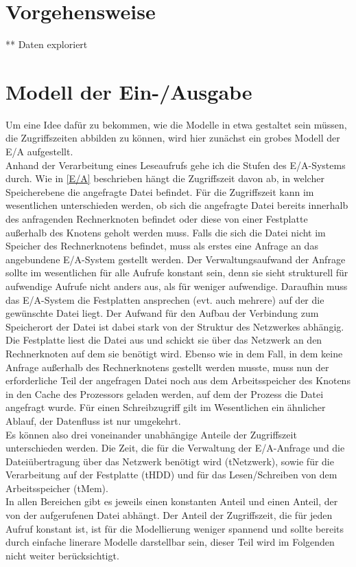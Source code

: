 \documentclass[
	12pt,
	a4paper,
	BCOR10mm,
	DIV14,
	listof=totoc,
	bibliography=totoc,
	headsepline
]{scrreprt}
\begin{document}
\section{Vorgehensweise}
** Daten exploriert\\


\section{Modell der Ein-/Ausgabe}
Um eine Idee dafür zu bekommen, wie die Modelle in etwa gestaltet sein müssen, die Zugriffszeiten abbilden zu können, wird hier zunächst ein grobes Modell der E/A aufgestellt.\\
Anhand der Verarbeitung eines Leseaufrufs gehe ich die Stufen des E/A-Systems durch. Wie in \ref{E/A} beschrieben hängt die Zugriffszeit davon ab, in welcher Speicherebene die angefragte Datei befindet. Für die Zugriffszeit kann im wesentlichen unterschieden werden, ob sich die angefragte Datei bereits innerhalb des anfragenden Rechnerknoten befindet oder diese von einer Festplatte außerhalb des Knotens geholt werden muss.
Falls die sich die Datei nicht im Speicher des Rechnerknotens befindet, muss als erstes eine Anfrage an das angebundene E/A-System gestellt werden. Der Verwaltungsaufwand der Anfrage sollte im wesentlichen für alle Aufrufe konstant sein, denn sie sieht strukturell für aufwendige Aufrufe nicht anders aus, als für weniger aufwendige.
Daraufhin muss das E/A-System die Festplatten ansprechen (evt. auch mehrere) auf der die gewünschte Datei liegt. Der Aufwand für den Aufbau der Verbindung zum Speicherort der Datei ist dabei stark von der Struktur des Netzwerkes abhängig. Die Festplatte liest die Datei aus und schickt sie über das Netzwerk an den Rechnerknoten auf dem sie benötigt wird.
Ebenso wie in dem Fall, in dem keine Anfrage außerhalb des Rechnerknotens gestellt werden musste, muss nun der erforderliche Teil der angefragen Datei noch aus dem Arbeitsspeicher des Knotens in den Cache des Prozessors geladen werden, auf dem der Prozess die Datei angefragt wurde. Für einen Schreibzugriff gilt im Wesentlichen ein ähnlicher Ablauf, der Datenfluss ist nur umgekehrt.\\
Es können also drei voneinander unabhängige Anteile der Zugriffszeit unterschieden werden. Die Zeit, die für die Verwaltung der E/A-Anfrage und die Dateiübertragung über das Netzwerk benötigt wird (tNetzwerk), sowie für die Verarbeitung auf der Festplatte (tHDD) und für das Lesen/Schreiben von dem Arbeitsspeicher (tMem).\\
In allen Bereichen gibt es jeweils einen konstanten Anteil und einen Anteil, der von der aufgerufenen Datei abhängt. 
Der Anteil der Zugriffszeit, die für jeden Aufruf konstant ist, ist für die Modellierung weniger spannend und sollte bereits durch einfache linerare Modelle darstellbar sein, dieser Teil wird im Folgenden nicht weiter berücksichtigt.
\end{document}
